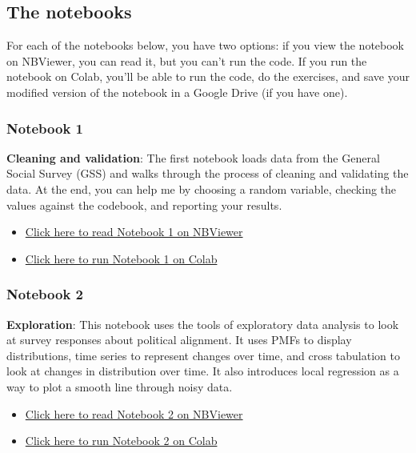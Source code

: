 \hypertarget{the-notebooks}{%
\subsection{The notebooks}\label{the-notebooks}}

For each of the notebooks below, you have two options: if you view the
notebook on NBViewer, you can read it, but you can't run the code. If
you run the notebook on Colab, you'll be able to run the code, do the
exercises, and save your modified version of the notebook in a Google
Drive (if you have one).

\hypertarget{notebook-1}{%
\subsubsection{Notebook 1}\label{notebook-1}}

\textbf{Cleaning and validation}: The first notebook loads data from the
General Social Survey (GSS) and walks through the process of cleaning
and validating the data. At the end, you can help me by choosing a
random variable, checking the values against the codebook, and reporting
your results.

\begin{itemize}
\item
  \href{https://nbviewer.jupyter.org/github/AllenDowney/PoliticalAlignmentCaseStudy/blob/master/01_clean.ipynb}{Click
  here to read Notebook 1 on NBViewer}
\item
  \href{https://colab.research.google.com/github/AllenDowney/PoliticalAlignmentCaseStudy/blob/master/01_clean.ipynb}{Click
  here to run Notebook 1 on Colab}
\end{itemize}

\hypertarget{notebook-2}{%
\subsubsection{Notebook 2}\label{notebook-2}}

\textbf{Exploration}: This notebook uses the tools of exploratory data
analysis to look at survey responses about political alignment. It uses
PMFs to display distributions, time series to represent changes over
time, and cross tabulation to look at changes in distribution over time.
It also introduces local regression as a way to plot a smooth line
through noisy data.

\begin{itemize}
\item
  \href{https://nbviewer.jupyter.org/github/AllenDowney/PoliticalAlignmentCaseStudy/blob/master/02_polviews.ipynb}{Click
  here to read Notebook 2 on NBViewer}
\item
  \href{https://colab.research.google.com/github/AllenDowney/PoliticalAlignmentCaseStudy/blob/master/02_polviews.ipynb}{Click
  here to run Notebook 2 on Colab}
\end{itemize}

